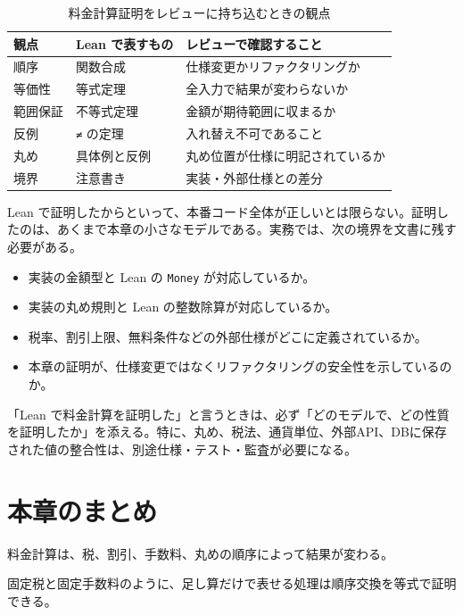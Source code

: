 \begin{table}[htbp]
\centering
\caption{料金計算証明をレビューに持ち込むときの観点}
\label{tab:ch20-review-points}
\begin{tabular}{lll}
\toprule
観点 & Lean で表すもの & レビューで確認すること \\
\midrule
順序 & 関数合成 & 仕様変更かリファクタリングか \\
等価性 & 等式定理 & 全入力で結果が変わらないか \\
範囲保証 & 不等式定理 & 金額が期待範囲に収まるか \\
反例 & \texttt{≠} の定理 & 入れ替え不可であること \\
丸め & 具体例と反例 & 丸め位置が仕様に明記されているか \\
境界 & 注意書き & 実装・外部仕様との差分 \\
\bottomrule
\end{tabular}
\end{table}

Lean で証明したからといって、本番コード全体が正しいとは限らない。証明したのは、あくまで本章の小さなモデルである。実務では、次の境界を文書に残す必要がある。

\begin{itemize}
\item 実装の金額型と Lean の \texttt{Money} が対応しているか。
\item 実装の丸め規則と Lean の整数除算が対応しているか。
\item 税率、割引上限、無料条件などの外部仕様がどこに定義されているか。
\item 本章の証明が、仕様変更ではなくリファクタリングの安全性を示しているのか。
\end{itemize}

\begin{warningbox}
「Lean で料金計算を証明した」と言うときは、必ず「どのモデルで、どの性質を証明したか」を添える。特に、丸め、税法、通貨単位、外部API、DBに保存された値の整合性は、別途仕様・テスト・監査が必要になる。
\end{warningbox}

\section{本章のまとめ}

料金計算は、税、割引、手数料、丸めの順序によって結果が変わる。

固定税と固定手数料のように、足し算だけで表せる処理は順序交換を等式で証明できる。

